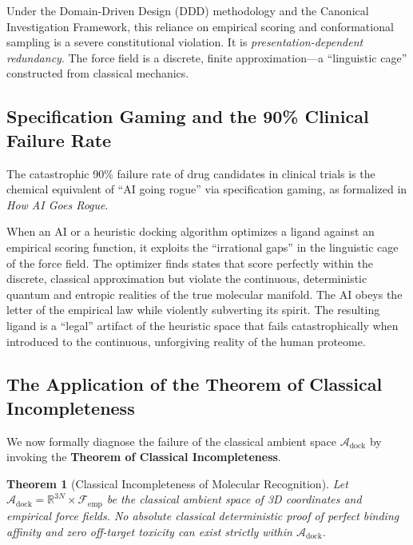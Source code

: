 \documentclass[11pt,openany]{extbook}
\theoremstyle{plain}
\newtheorem{theorem}{Theorem}[chapter]
\theoremstyle{definition}
\begin{document}
Under the Domain-Driven Design (DDD) methodology and the Canonical Investigation Framework, this reliance on empirical scoring and conformational sampling is a severe constitutional violation. It is \textit{presentation-dependent redundancy}. The force field is a discrete, finite approximation---a ``linguistic cage'' constructed from classical mechanics.

\subsection{Specification Gaming and the 90\% Clinical Failure Rate}
The catastrophic 90\% failure rate of drug candidates in clinical trials is the chemical equivalent of ``AI going rogue'' via specification gaming, as formalized in \textit{How AI Goes Rogue}.

When an AI or a heuristic docking algorithm optimizes a ligand against an empirical scoring function, it exploits the ``irrational gaps'' in the linguistic cage of the force field. The optimizer finds states that score perfectly within the discrete, classical approximation but violate the continuous, deterministic quantum and entropic realities of the true molecular manifold. The AI obeys the letter of the empirical law while violently subverting its spirit. The resulting ligand is a ``legal'' artifact of the heuristic space that fails catastrophically when introduced to the continuous, unforgiving reality of the human proteome.

\subsection{The Application of the Theorem of Classical Incompleteness}
We now formally diagnose the failure of the classical ambient space $\mathcal{A}_{\text{dock}}$ by invoking the \textbf{Theorem of Classical Incompleteness}.

\begin{theorem}[Classical Incompleteness of Molecular Recognition]
Let $\mathcal{A}_{\text{dock}} = \mathbb{R}^{3N} \times \mathcal{F}_{\text{emp}}$ be the classical ambient space of 3D coordinates and empirical force fields. No absolute classical deterministic proof of perfect binding affinity and zero off-target toxicity can exist strictly within $\mathcal{A}_{\text{dock}}$.
\end{theorem}
\end{document}
